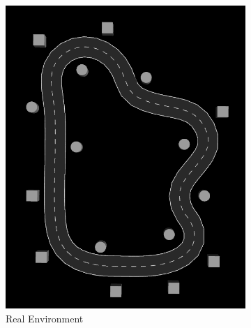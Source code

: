 \begin{figure}[H]
	\centering
	\begin{subfigure}{.3\linewidth}
		\includegraphics[width=\textwidth]{Pictures/2slamtest}
		\caption{Real Environment}
		\end{subfigure}	
	\begin{subfigure}{.3\linewidth}

\end{subfigure}
\end{figure}
